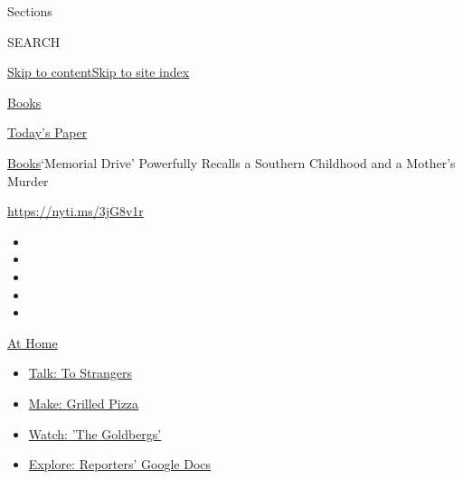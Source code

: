 Sections

SEARCH

\protect\hyperlink{site-content}{Skip to
content}\protect\hyperlink{site-index}{Skip to site index}

\href{https://www.nytimes3xbfgragh.onion/section/books}{Books}

\href{https://myaccount.nytimes3xbfgragh.onion/auth/login?response_type=cookie\&client_id=vi}{}

\href{https://www.nytimes3xbfgragh.onion/section/todayspaper}{Today's
Paper}

\href{/section/books}{Books}\textbar{}`Memorial Drive' Powerfully
Recalls a Southern Childhood and a Mother's Murder

\url{https://nyti.ms/3jG8v1r}

\begin{itemize}
\item
\item
\item
\item
\item
\end{itemize}

\href{https://www.nytimes3xbfgragh.onion/spotlight/at-home?action=click\&pgtype=Article\&state=default\&region=TOP_BANNER\&context=at_home_menu}{At
Home}

\begin{itemize}
\tightlist
\item
  \href{https://www.nytimes3xbfgragh.onion/2020/08/03/well/family/the-benefits-of-talking-to-strangers.html?action=click\&pgtype=Article\&state=default\&region=TOP_BANNER\&context=at_home_menu}{Talk:
  To Strangers}
\item
  \href{https://www.nytimes3xbfgragh.onion/2020/08/01/at-home/coronavirus-make-pizza-on-a-grill.html?action=click\&pgtype=Article\&state=default\&region=TOP_BANNER\&context=at_home_menu}{Make:
  Grilled Pizza}
\item
  \href{https://www.nytimes3xbfgragh.onion/2020/07/31/arts/television/goldbergs-abc-stream.html?action=click\&pgtype=Article\&state=default\&region=TOP_BANNER\&context=at_home_menu}{Watch:
  'The Goldbergs'}
\item
  \href{https://www.nytimes3xbfgragh.onion/interactive/2020/at-home/even-more-reporters-editors-diaries-lists-recommendations.html?action=click\&pgtype=Article\&state=default\&region=TOP_BANNER\&context=at_home_menu}{Explore:
  Reporters' Google Docs}
\end{itemize}


